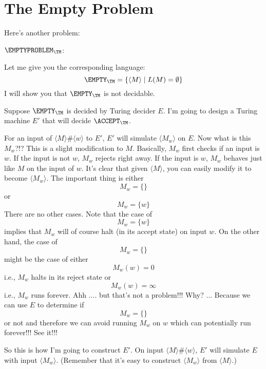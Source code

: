 \section{The Empty Problem}

Here's another problem:

$\EMPTYPROBLEM_\TM$\tinysidebar{$\EMPTYPROBLEM_\TM$}: 

Let me give you the corresponding language:
\[
\EMPTY_\TM
= \{ \langle M \rangle \mid L(M) = \emptyset \}
\]
I will show you that $\EMPTY_\TM$ is not decidable.

Suppose $\EMPTY_\TM$ is decided by Turing decider $E$.
I'm going to design a Turing machine $E'$ that will decide
$\ACCEPT_\TM$.

For an input of $\langle M \rangle \# \langle w \rangle$
to $E'$, $E'$ will simulate 
$\langle M_w \rangle$ on $E$.
Now what is this $M_w$?!?
This is a slight modification to $M$.
Basically, $M_w$ first checks if an input is $w$.
If the input is not $w$, $M_w$ rejects right away.
If the input is $w$, $M_w$ behaves just like $M$ on the input of $w$.
It's clear that given $\langle M \rangle$,
you can easily modify it to become $\langle M_w \rangle$.
The important thing is either
\[
M_w = \{\}
\]
or 
\[
M_w = \{w\}
\]
There are no other cases.
Note that the case of 
\[
M_w = \{w\}
\]
implies that $M_w$ will of course halt (in its accept state)
on input $w$.
On the other hand, the case of
\[
M_w = \{\}
\]
might be the case of either 
\[
M_w(w) = 0
\]
i.e., $M_w$ halts in its reject state or 
\[
M_w(w) = \infty
\]
i.e., $M_w$ runs forever.
Ahh .... but that's not a problem!!!
Why? ... Because we can use $E$ to determine if 
\[
M_w = \{\}
\]
or not
and therefore we can avoid running $M_w$ on $w$ which 
can potentially run forever!!! 
See it!!!

So this is how I'm going to construct $E'$.
On input $\langle M \rangle \# \langle w \rangle$,
$E'$ will simulate 
$E$ with input $\langle M_w \rangle$.
(Remember that it's easy to construct 
$\langle M_w \rangle$ from $\langle M \rangle$.)

